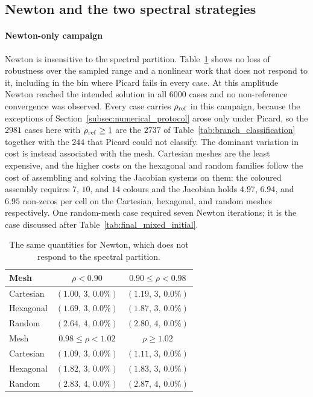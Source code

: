 \subsection{Newton and the two spectral strategies}
\label{subsec:newton_and_mixed}

\paragraph{Newton-only campaign}
Newton is insensitive to the spectral partition. Table~\ref{tab:final_newton} shows no loss of robustness over the sampled range and a nonlinear work that does not respond to it, including in the bin where Picard fails in every case. At this amplitude Newton reached the intended solution in all $6000$ cases and no non-reference convergence was observed. Every case carries $\rho_{\rm ref}$ in this campaign, because the exceptions of Section~\ref{subsec:numerical_protocol} arose only under Picard, so the $2981$ cases here with $\rho_{\rm ref}\geq1$ are the $2737$ of Table~\ref{tab:branch_classification} together with the $244$ that Picard could not classify.  The dominant variation in cost is instead associated with the mesh. Cartesian meshes are the least expensive, and the higher costs on the hexagonal and random families follow the cost of assembling and solving the Jacobian systems on them: the coloured assembly requires $7$, $10$, and $14$ colours and the Jacobian holds $4.97$, $6.94$, and $6.95$ non-zeros per cell on the Cartesian, hexagonal, and random meshes respectively. One random-mesh case required seven Newton iterations; it is the case discussed after Table~\ref{tab:final_mixed_initial}.

\begin{table}[htb]
\centering
\caption{The same quantities for Newton, which does not respond to the spectral partition.}
\label{tab:final_newton}
\setlength{\tabcolsep}{7pt}
\begin{tabular}{lcc}
\toprule
\rowcolor{gray!12}
Mesh &
$\rho<0.90$ &
$0.90\leq\rho<0.98$ \\
\midrule
Cartesian &
$(1.00,\,3,\,0.0\%)$ &
$(1.19,\,3,\,0.0\%)$ \\
Hexagonal &
$(1.69,\,3,\,0.0\%)$ &
$(1.87,\,3,\,0.0\%)$ \\
Random &
$(2.64,\,4,\,0.0\%)$ &
$(2.80,\,4,\,0.0\%)$ \\

\addlinespace[2pt]
\rowcolor{gray!12}
Mesh &
$0.98\leq\rho<1.02$ &
$\rho\geq1.02$ \\
\midrule
Cartesian &
$(1.09,\,3,\,0.0\%)$ &
$(1.11,\,3,\,0.0\%)$ \\
Hexagonal &
$(1.82,\,3,\,0.0\%)$ &
$(1.83,\,3,\,0.0\%)$ \\
Random &
$(2.83,\,4,\,0.0\%)$ &
$(2.87,\,4,\,0.0\%)$ \\
\bottomrule
\end{tabular}
\end{table}

